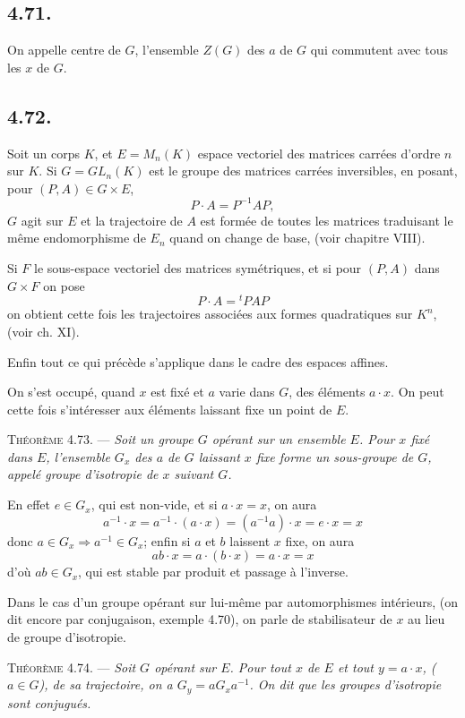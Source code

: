 \subsection*{4.71.}
On appelle centre de $G$, l'ensemble $Z(G)$ des $a$ de $G$ qui commutent avec tous les $x$ de $G$.

\subsection*{4.72.}
Soit un corps $K$, et $E=M_n(K)$ espace vectoriel des matrices carrées d'ordre $n$ sur $K$. Si $G=GL_n(K)$ est le groupe des matrices carrées inversibles, en posant, pour $(P,A)\in G\times E$,
\[
P\cdot A=P^{-1}AP,
\]
$G$ agit sur $E$ et la trajectoire de $A$ est formée de toutes les matrices traduisant le même endomorphisme de $E_n$ quand on change de base, (voir chapitre VIII).

Si $F$  le sous-espace vectoriel des matrices symétriques, et si pour $(P,A)$ dans $G\times F$ on pose
\[
P\cdot A={}^{t}PAP
\]
on obtient cette fois les trajectoires associées aux formes quadratiques sur $K^n$, (voir ch. XI).

Enfin tout ce qui précède s'applique dans le cadre des espaces affines.

On s'est occupé, quand $x$ est fixé et $a$ varie dans $G$, des éléments $a\cdot x$. On peut cette fois s'intéresser aux éléments laissant fixe un point de $E$.

\medskip\noindent\textsc{Théorème 4.73.} --- \emph{Soit un groupe $G$ opérant sur un ensemble $E$. Pour $x$ fixé dans $E$, l'ensemble $G_x$ des $a$ de $G$ laissant $x$ fixe forme un sous-groupe de $G$, appelé groupe d'isotropie de $x$ suivant $G$.}

En effet $e\in G_x$, qui est non-vide, et si $a\cdot x=x$, on aura
\[
a^{-1}\cdot x=a^{-1}\cdot(a\cdot x)=(a^{-1}a)\cdot x=e\cdot x=x
\]
donc $a\in G_x\Rightarrow a^{-1}\in G_x$; enfin si $a$ et $b$ laissent $x$ fixe, on aura
\[
ab\cdot x=a\cdot(b\cdot x)=a\cdot x=x
\]
d'où $ab\in G_x$, qui est stable par produit et passage à l'inverse. \bookend

Dans le cas d'un groupe opérant sur lui-même par automorphismes intérieurs, (on dit encore par conjugaison, exemple 4.70), on parle de stabilisateur de $x$ au lieu de groupe d'isotropie.

\medskip\noindent\textsc{Théorème 4.74.} --- \emph{Soit $G$ opérant sur $E$. Pour tout $x$ de $E$ et tout $y=a\cdot x$, ($a\in G$), de sa trajectoire, on a $G_y=aG_xa^{-1}$. On dit que les groupes d'isotropie sont conjugués.}

